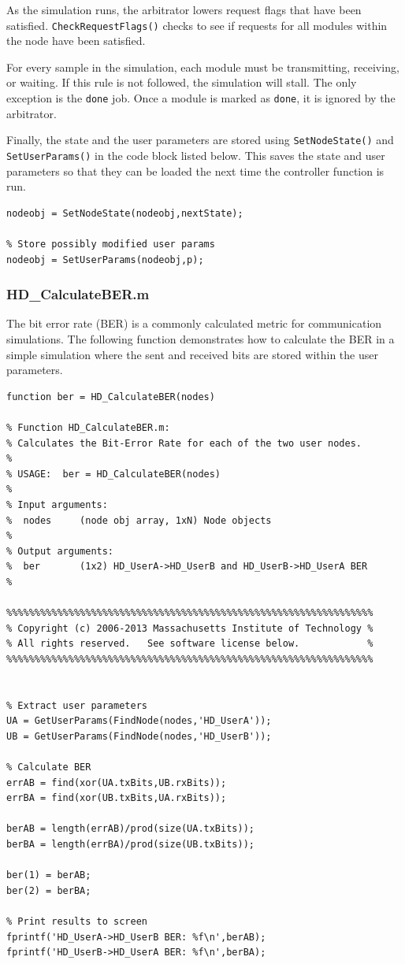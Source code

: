 As the simulation runs, the arbitrator lowers request flags that
have been satisfied.  \verb+CheckRequestFlags()+ checks to see if
requests for all modules within the node have been satisfied.

For every sample in the simulation, each module must be
transmitting, receiving, or waiting.  If this rule is not followed,
the simulation will stall.  The only exception is the \verb+done+
job. Once a module is marked as \verb+done+, it is ignored by the
arbitrator.

Finally, the state and the user parameters are stored using
\verb+SetNodeState()+ and \verb+SetUserParams()+ in the code block
listed below.  This saves the state and user parameters so that they
can be loaded the next time the controller function is run.

\begin{lstlisting}[name=hdState]
% Set next state
nodeobj = SetNodeState(nodeobj,nextState);

% Store possibly modified user params
nodeobj = SetUserParams(nodeobj,p);
\end{lstlisting}


\subsubsection{HD\_CalculateBER.m}

The bit error rate (BER) is a commonly calculated metric for
communication simulations.  The following function demonstrates how
to calculate the BER in a simple simulation where the sent and
received bits are stored within the user parameters.

\begin{lstlisting}[name=ber]
function ber = HD_CalculateBER(nodes)

% Function HD_CalculateBER.m:
% Calculates the Bit-Error Rate for each of the two user nodes.
%
% USAGE:  ber = HD_CalculateBER(nodes)
%
% Input arguments:
%  nodes     (node obj array, 1xN) Node objects
%
% Output arguments:
%  ber       (1x2) HD_UserA->HD_UserB and HD_UserB->HD_UserA BER
%

%%%%%%%%%%%%%%%%%%%%%%%%%%%%%%%%%%%%%%%%%%%%%%%%%%%%%%%%%%%%%%%%%
% Copyright (c) 2006-2013 Massachusetts Institute of Technology %
% All rights reserved.   See software license below.            %
%%%%%%%%%%%%%%%%%%%%%%%%%%%%%%%%%%%%%%%%%%%%%%%%%%%%%%%%%%%%%%%%%


% Extract user parameters
UA = GetUserParams(FindNode(nodes,'HD_UserA'));
UB = GetUserParams(FindNode(nodes,'HD_UserB'));

% Calculate BER
errAB = find(xor(UA.txBits,UB.rxBits));
errBA = find(xor(UB.txBits,UA.rxBits));

berAB = length(errAB)/prod(size(UA.txBits));
berBA = length(errBA)/prod(size(UB.txBits));

ber(1) = berAB;
ber(2) = berBA;

% Print results to screen
fprintf('HD_UserA->HD_UserB BER: %f\n',berAB);
fprintf('HD_UserB->HD_UserA BER: %f\n',berBA);
\end{lstlisting}

